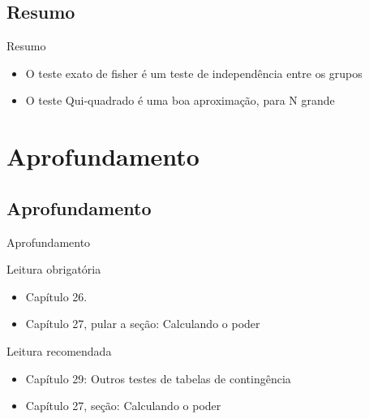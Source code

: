 \documentclass{beamer}
\begin{document}
\subsection{Resumo}

\begin{frame}{Resumo}
  \begin{itemize}
  \item O teste exato de fisher é um teste de independência entre os grupos
  \item O teste Qui-quadrado é uma boa aproximação, para N grande
  \end{itemize}
\end{frame}

\section{Aprofundamento}

\subsection{Aprofundamento}

\begin{frame}{Aprofundamento}
  \begin{block}{Leitura obrigatória}
    \begin{itemize}
      \footnotesize
    \item Capítulo 26.
    \item Capítulo 27, pular a seção: Calculando o poder
    \end{itemize}
  \end{block}
  \begin{block}{Leitura recomendada}
    \begin{itemize}
      \scriptsize
    \item Capítulo 29: Outros testes de tabelas de contingência
    \item Capítulo 27, seção: Calculando o poder
    \end{itemize}
  \end{block}
\end{frame}
\end{document}
